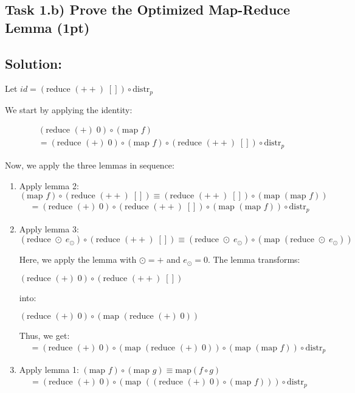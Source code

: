 \documentclass{article}
\begin{document}
\subsection{Task 1.b) Prove the Optimized Map-Reduce Lemma (1pt)}

\subsection*{Solution:}

Let $id = (\text{reduce } (++) \; []) \circ \text{distr}_p$

We start by applying the identity:

\begin{align*}
&(\text{reduce } (+) \; 0) \circ (\text{map } f) \\
&= (\text{reduce } (+) \; 0) \circ (\text{map } f) \circ  (\text{reduce } (++) \; []) \circ \text{distr}_p
\end{align*}

Now, we apply the three lemmas in sequence:

\begin{enumerate}
    \item Apply lemma 2: $(\text{map } f) \circ (\text{reduce } (++)\; []) \equiv (\text{reduce } (++)\; []) \circ (\text{map } (\text{map } f))$
    \begin{align*}
    &= (\text{reduce } (+) \; 0) \circ (\text{reduce } (++) \; []) \circ (\text{map } (\text{map } f)) \circ \text{distr}_p
    \end{align*}

    \item Apply lemma 3: $(\text{reduce } \odot\; e_\odot) \circ (\text{reduce } (++)\; []) \equiv (\text{reduce } \odot\; e_\odot) \circ (\text{map } (\text{reduce } \odot\; e_\odot))$
    
    Here, we apply the lemma with $\odot = +$ and $e_\odot = 0$. The lemma transforms:
    
    $(\text{reduce } (+) \; 0) \circ (\text{reduce } (++) \; [])$
    
    into:
    
    $(\text{reduce } (+) \; 0) \circ (\text{map } (\text{reduce } (+) \; 0))$
    
    Thus, we get:
    \begin{align*}
    &= (\text{reduce } (+) \; 0) \circ (\text{map } (\text{reduce } (+) \; 0)) \circ (\text{map } (\text{map } f)) \circ \text{distr}_p
    \end{align*}

    \item Apply lemma 1: $(\text{map } f) \circ (\text{map } g) \equiv \text{map}(f \circ g)$
    \begin{align*}
    &= (\text{reduce } (+) \; 0) \circ (\text{map } ((\text{reduce } (+) \; 0) \circ (\text{map } f))) \circ \text{distr}_p
    \end{align*}
\end{enumerate}
\end{document}
